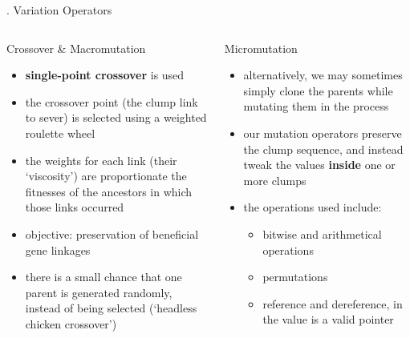 \documentclass[9pt]{beamer}
\begin{document}
\begin{frame}[t]{\theframenumber. Variation Operators}
  \begin{columns}
    \begin{column}{.5\textwidth}
      Crossover \& Macromutation
      \begin{itemize}
      \item \textbf{single-point crossover} is used
      \item the crossover point (the clump link to sever) is selected using a weighted roulette wheel
      \item the weights for each link (their `viscosity') are proportionate the fitnesses of the ancestors in which those links occurred
      \item objective: preservation of beneficial gene linkages
      \item there is a small chance that one parent is generated randomly, instead of being selected (`headless chicken crossover')
      \end{itemize}
      
    \end{column}
    \begin{column}{.5\textwidth}
      Micromutation
      \begin{itemize}
      \item alternatively, we may sometimes simply clone the parents while mutating them in the process
      \item our mutation operators preserve the clump sequence, and instead tweak the values \textbf{inside} one or more clumps
      \item the operations used include:
        \begin{itemize}
        \item bitwise and arithmetical operations
        \item permutations
        \item reference and dereference, in the value is a valid pointer
        \end{itemize}
      \end{itemize}
    \end{column}
  \end{columns}
\end{frame}
\end{document}
